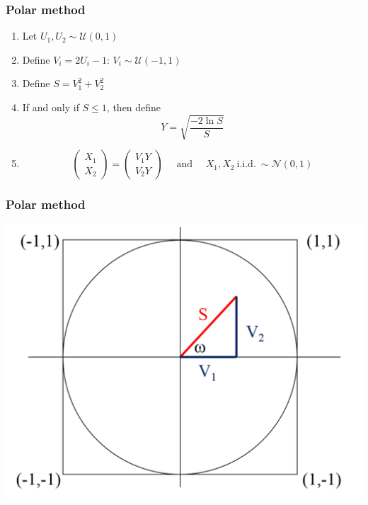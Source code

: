 \documentclass[10pt, serif, mathserif]{beamer}
\begin{document}
\begin{frame}
  \frametitle{Polar method}
  \begin{enumerate}
    \item Let $U_1, U_2 \sim \mathcal{U}(0,1)$
    \item Define $V_i = 2U_i - 1$: $V_i \sim \mathcal{U}(-1,1)$
    \item Define $S = V_1^2 + V_2^2$
    \item If and only if $S \leq 1$, then define
      \[ Y = \sqrt{\frac{-2\ln{S}}{S}} \]
    \item \[
        \left( \begin{matrix} X_1 \\ X_2 \end{matrix} \right) = \left( \begin{matrix} V_1 Y \\ V_2 Y \end{matrix} \right)
        \quad \text{ and } \quad X_1,X_2\ \text{i.i.d.}\ \sim \mathcal{N}(0,1)
      \]
  \end{enumerate}  
\end{frame}

\begin{frame}
  \frametitle{Polar method}
  \includegraphics[width=\textwidth]{Picture2.png}
\end{frame}
\end{document}
